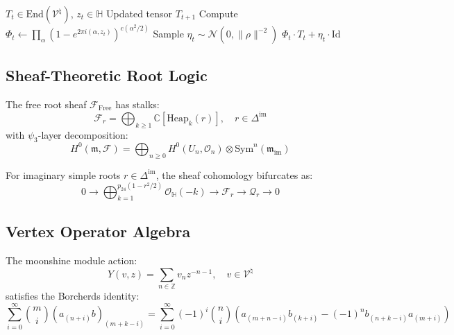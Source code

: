 \documentclass[12pt]{article}
\begin{document}
\begin{algorithm}[H]
\caption{Lie-Algebraic Tensor Update}
\begin{algorithmic}[1]
\Require $T_t \in \text{End}(\mathcal{V}^\natural)$, $z_t \in \mathbb{H}$
\Ensure Updated tensor $T_{t+1}$
\State Compute $\Phi_t \gets \prod_{\alpha} (1 - e^{2\pi i (\alpha,z_t)})^{c(\alpha^2/2)}$
\State Sample $\eta_t \sim \mathcal{N}(0,\|\rho\|^{-2})$
\State \Return $\Phi_t \cdot T_t + \eta_t \cdot \text{Id}$
\end{algorithmic}
\end{algorithm}

\subsection{Sheaf-Theoretic Root Logic}

\begin{definition}
The free root sheaf $\mathscr{F}_{\text{Free}}$ has stalks:
\begin{equation}
    \mathscr{F}_r = \bigoplus_{k\geq1} \mathbb{C}[\text{Heap}_k(r)], \quad r \in \Delta^{\text{im}}
\end{equation}
with $\psi_3$-layer decomposition:
\begin{equation}
    H^0(\mathfrak{m},\mathscr{F}) = \bigoplus_{n\geq0} H^0(U_n, \mathscr{O}_n) \otimes \text{Sym}^n(\mathfrak{m}_{\text{im}})
\end{equation}
\end{definition}

\begin{theorem}
For imaginary simple roots $r \in \Delta^{\text{im}}$, the sheaf cohomology bifurcates as:
\begin{equation}
    0 \to \bigoplus_{k=1}^{p_{24}(1-r^2/2)} \mathcal{O}_{\mathbb{H}}(-k) \to \mathscr{F}_r \to \mathcal{Q}_r \to 0
\end{equation}
\end{theorem}

\subsection{Vertex Operator Algebra}

The moonshine module action:
\begin{equation}
    Y(v,z) = \sum_{n \in \mathbb{Z}} v_n z^{-n-1}, \quad v \in \mathcal{V}^\natural
\end{equation}
satisfies the Borcherds identity:
\begin{equation}
    \sum_{i=0}^\infty \binom{m}{i} (a_{(n+i)} b)_{(m+k-i)} = \sum_{i=0}^\infty (-1)^i \binom{n}{i} \left(a_{(m+n-i)} b_{(k+i)} - (-1)^n b_{(n+k-i)} a_{(m+i)}\right)
\end{equation}
\end{document}
